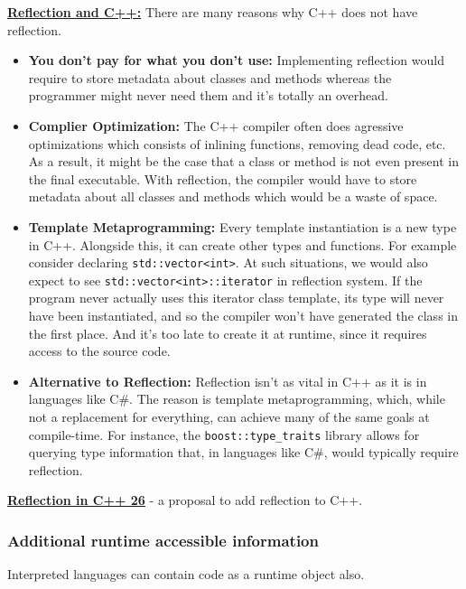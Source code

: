 \documentclass[11pt,paper=a4,answers]{exam}
\begin{document}
 \begin{tcolorbox}
    \href{https://stackoverflow.com/questions/359237/why-does-c-not-have-reflection}{\textbf{Reflection and C++:}} There are many reasons why C++ does not have reflection. 
    \begin{itemize}
        \item \textbf{You don't pay for what you don't use:} Implementing reflection would require to store metadata about classes and methods whereas the programmer might never need them and it's totally an overhead.
        \item \textbf{Complier Optimization:} The C++ compiler often does agressive optimizations which consists of inlining functions, removing dead code, etc. As a result, it might be the case that a class or method is not even present in the final executable. With reflection, the compiler would have to store metadata about all classes and methods which would be a waste of space.


 \item \textbf{Template Metaprogramming:}
 Every template instantiation is a new type in C++. Alongside this, it can create other types and functions. For example consider declaring \texttt{std::vector<int>}. At such situations, we would also expect to see \texttt{std::vector<int>::iterator} in reflection system.  If the program never actually uses this iterator class template, its type will never have been instantiated, and so the compiler won't have generated the class in the first place. And it's too late to create it at runtime, since it requires access to the source code.
 \item \textbf{Alternative to Reflection:} Reflection isn't as vital in C++ as it is in languages like C\#. The reason is template metaprogramming, which, while not a replacement for everything, can achieve many of the same goals at compile-time. For instance, the \texttt{boost::type\_traits} library allows for querying type information that, in languages like C\#, would typically require reflection. 
 \end{itemize}
 \href{https://www.open-std.org/jtc1/sc22/wg21/docs/papers/2023/p2996r0.html}{\textbf{Reflection in C++ 26}} - a proposal to add reflection to C++.
\end{tcolorbox}

\subsubsection{Additional runtime accessible information}\label{sec:runtime}
Interpreted languages can contain code as a runtime object also.
\end{document}
